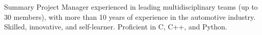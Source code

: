 
\summary
{Summary}
{Project Manager experienced in leading multidisciplinary teams (up to 30 members), with more than 10 years of experience in the automotive industry. Skilled, innovative, and self-learner. Proficient in C, C++, and Python.}

